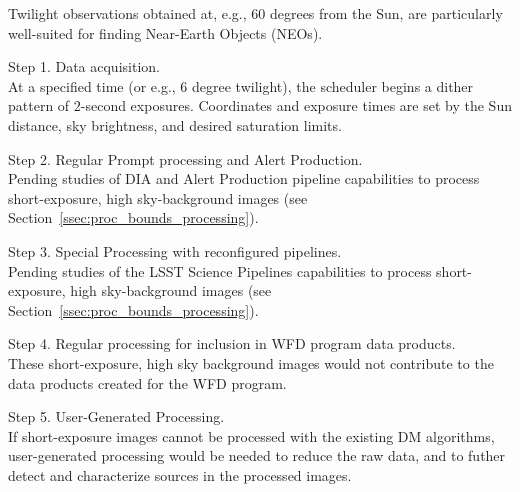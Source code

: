 Twilight observations obtained at, e.g., 60 degrees from the Sun, are particularly
well-suited for finding Near-Earth Objects (NEOs).

Step 1. Data acquisition. \\
At a specified time (or e.g., 6 degree twilight), the scheduler begins a dither pattern of 
$2$-second exposures. 
Coordinates and exposure times are set by the Sun distance, sky brightness, and desired saturation limits.

Step 2. Regular Prompt processing and Alert Production. \\
Pending studies of DIA and Alert Production pipeline capabilities to process 
short-exposure, high sky-background images (see Section~\ref{ssec:proc_bounds_processing}).

Step 3. Special Processing with reconfigured pipelines. \\
Pending studies of the LSST Science Pipelines capabilities to process 
short-exposure, high sky-background images (see Section~\ref{ssec:proc_bounds_processing}).

Step 4. Regular processing for inclusion in WFD program data products. \\
These short-exposure, high sky background images would not contribute to the data products created for the WFD program.

Step 5. User-Generated Processing. \\
If short-exposure images cannot be processed with the existing DM algorithms, 
user-generated processing would be needed to reduce the raw data, and to 
futher detect and characterize sources in the processed images.



